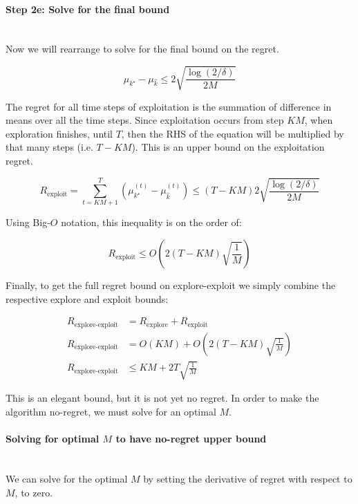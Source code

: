 \documentclass[11pt]{article}
\begin{document}
\paragraph{Step 2e: Solve for the final bound}
\noindent \\
Now we will rearrange to solve for the final bound on the regret.

\begin{equation}
    \mu_{k^\star} - \mu_{\hat{k}} \leq 2\sqrt{\frac{\log(2 / \delta)}{2M}}
\end{equation}

The regret for all time steps of exploitation is the summation of difference in means over all the time steps. Since exploitation occurs from step $KM$, when exploration finishes, until $T$, then the RHS of the equation will be multiplied by that many steps (i.e. $T - KM$). This is an upper bound on the exploitation regret.

\begin{equation}
    R_{\text{exploit}} = \sum_{t=KM+1}^T (\mu_{k^\star}^{(t)} - \mu_{\hat{k}}^{(t)}) \leq (T - KM) 2\sqrt{\frac{\log(2 / \delta)}{2M}}
\end{equation}

Using Big-$O$ notation, this inequality is on the order of:

\begin{equation}
    R_{\text{exploit}} \leq O(2(T-KM)\sqrt{\frac{1}{M}})
\end{equation}

Finally, to get the full regret bound on explore-exploit we simply combine the respective explore and exploit bounds:

\begin{align}
    R_{\text{explore-exploit}} &=  R_{\text{explore}} + R_{\text{exploit}} \\
    R_{\text{explore-exploit}} &=  O(KM) + O(2(T-KM)\sqrt{\frac{1}{M}}) \\
    R_{\text{explore-exploit}} & \leq  KM + 2T\sqrt{\frac{1}{M}}
\end{align}

This is an elegant bound, but it is not yet no regret. In order to make the algorithm no-regret, we must solve for an optimal $M$. 

\paragraph{Solving for optimal $M$ to have no-regret upper bound}
\noindent \\
We can solve for the optimal $M$ by setting the derivative of regret with respect to $M$, to zero. 
\end{document}
